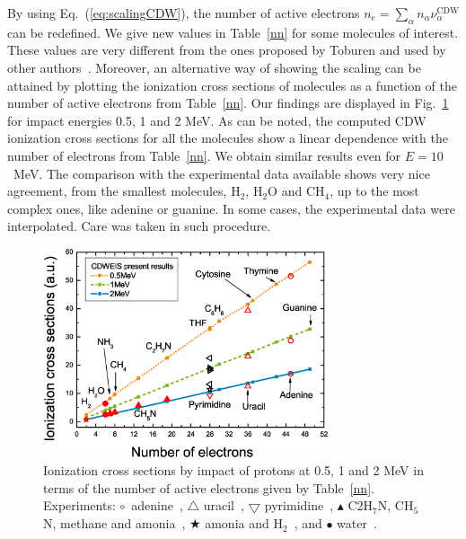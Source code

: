 \documentclass[preprint,12pt]{article}
\begin{document}
By using Eq.~(\ref{eq:scalingCDW}), the number of active electrons 
$n_e=\sum_{\alpha} n_{\alpha} \nu_{\alpha}^{\text{CDW}}$ can be redefined. 
We give new values in Table~\ref{nn} for some molecules of interest.
These values are very different from the ones proposed by Toburen and used by 
other authors~\cite{itoh2013}.
Moreover, an alternative way of showing the scaling can be attained by 
plotting the ionization cross sections of molecules as a function of the 
number of active electrons from Table~\ref{nn}. Our findings are displayed 
in Fig.~\ref{fig:recta} for impact energies 0.5, 1 and 2 MeV. As can be 
noted, the computed CDW ionization cross sections for all the molecules  
show a linear dependence with the number of electrons from Table~\ref{nn}. 
We obtain similar results even for $E=10$~MeV. The comparison with the 
experimental data available shows very nice agreement, from the smallest 
molecules, H$_2$, H$_2$O and CH$_4$, up to the most complex ones, like 
adenine or guanine. In some cases, the experimental data were interpolated.
Care was taken in such procedure.

\begin{figure}[t!]
\centering
\includegraphics[width=0.75\textwidth]{figuras/Fig_finales/fig_recta.eps}
\caption{Ionization cross sections by impact of protons at 0.5, 1 and 2 MeV
in terms of the number of active electrons given by Table~\ref{nn}.
Experiments: $\circ$~adenine~\cite{iriki2011}, $\triangle$ uracil~\cite{itoh2013}, 
$\bigtriangledown$ pyrimidine~\cite{wolff2014}, 
$\blacktriangle$ C2H$_7$N, CH$_5$N, methane and amonia~\cite{lynch1976},
$\bigstar$ amonia and H$_2$~\cite{rudd1985}, and $\bullet$ water~\cite{luna2007}.}
\label{fig:recta}
\end{figure}

\end{document}
